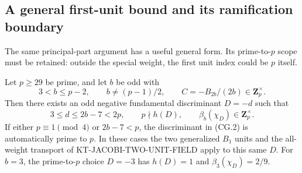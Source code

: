 \subsection{A general first-unit bound and its ramification boundary}

The same principal-part argument has a useful general form.
Its prime-to-$p$ scope must be retained: outside the special
weight, the first unit index could be $p$ itself.

\begin{proposition}
Let $p\geq29$ be prime, and let $b$ be odd with
\[
 3<b\leq p-2,\qquad b\ne(p-1)/2,
 \qquad C=-B_{2b}/(2b)\in\mathbf Z_p^\times.
 \tag{CG.1}
\]
Then there exists an odd negative fundamental discriminant
$D=-d$ such that
\[
 3\leq d\leq2b-7<2p,
 \qquad p\nmid h(D),\qquad
 \beta_b(\chi_D)\in\mathbf Z_p^\times.
 \tag{CG.2}
\]
If either $p\equiv1\pmod4$ or $2b-7<p$, the discriminant
in (CG.2) is automatically prime to $p$.  In these cases
the two generalized $B_1$ units and the all-weight transport
of KT-JACOBI-TWO-UNIT-FIELD apply to this same $D$.
For $b=3$, the prime-to-$p$ choice $D=-3$ has
$h(D)=1$ and $\beta_3(\chi_D)=2/9$.
\end{proposition}

